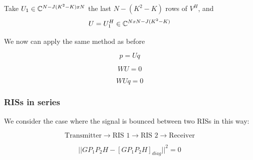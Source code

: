 Take $U_1 \in \mathbb{C} ^ {N - J(K^2 - K) x N}$ the last $N - (K^2 - K)$ rows of $V^H$, and
\begin{equation}
  U = U_1^H \in \mathbb{C} ^ {N x N - J(K^2 - K)}
\end{equation}

We now can apply the same method as before

\begin{equation}p = Uq\end{equation}

\begin{equation}WU = 0\end{equation}

\begin{equation}WUq = 0\end{equation}

\subsubsection{RISs in series}

We consider the case where the signal is bounced between two RISs in this way:

\begin{equation}
  \text{Transmitter} \rightarrow \text{RIS 1} \rightarrow \text{RIS 2} \rightarrow \text{Receiver}
\end{equation}

\begin{equation}
  || GP_1P_2H - [GP_1P_2H]_{diag} || ^2 = 0
\end{equation}
